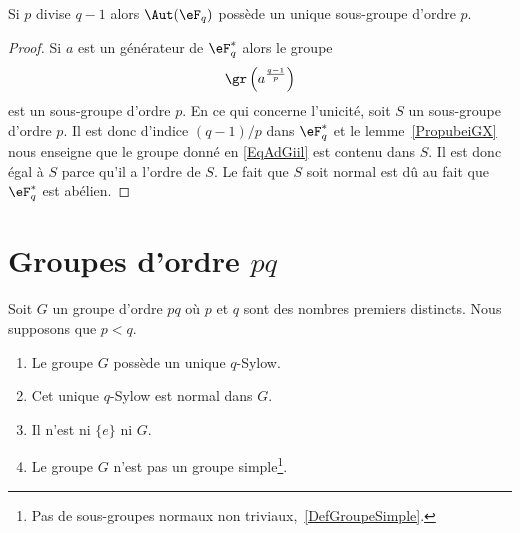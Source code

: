 \begin{corollary}       \label{CorwgmoTK}
    Si \( p\) divise \( q-1\) alors \( \Aut(\eF_q)\) possède un unique sous-groupe d'ordre \( p\).
\end{corollary}

\begin{proof}
    Si \( a\) est un générateur de \( \eF_q^*\) alors le groupe
    \begin{equation}    \label{EqAdGiil}
        \gr\left( a^{\frac{ q-1 }{ p }} \right)
    \end{equation}
    est un sous-groupe d'ordre \( p\). En ce qui concerne l'unicité, soit \( S\) un sous-groupe d'ordre \( p\). Il est donc d'indice \( (q-1)/p\) dans \( \eF_q^*\) et le lemme~\ref{PropubeiGX} nous enseigne que le groupe donné en \eqref{EqAdGiil} est contenu dans \( S\). Il est donc égal à \( S\) parce qu'il a l'ordre de \( S\). Le fait que \( S\) soit normal est dû au fait que \( \eF_q^*\) est abélien.
\end{proof}



\section{Groupes d'ordre \texorpdfstring{$ pq$}{pq}}

\begin{lemma}
    Soit \( G\) un groupe d'ordre \( pq\) où \( p\) et \( q\) sont des nombres premiers distincts. Nous supposons que \( p<q\).
    \begin{enumerate}
        \item
            Le groupe \( G\) possède un unique \( q\)-Sylow.
        \item
            Cet unique \( q\)-Sylow est normal dans \( G\).
        \item
            Il n'est ni \( \{ e \}\) ni \( G\).
        \item
            Le groupe \( G\) n'est pas un groupe simple\footnote{Pas de sous-groupes normaux non triviaux,~\ref{DefGroupeSimple}.}.
    \end{enumerate}
\end{lemma}


